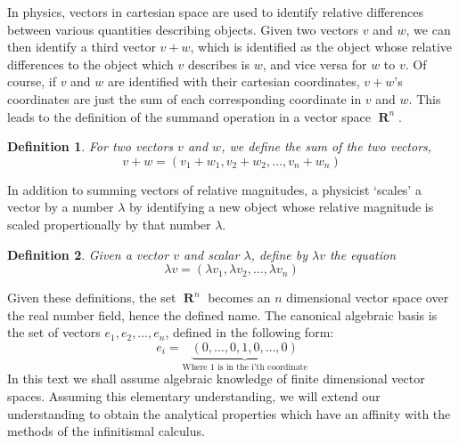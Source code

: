 \documentclass{report}
\newtheorem{definition}{Definition}
\DeclareMathOperator{\real}{\mathbf{R}}
\begin{document}
In physics, vectors in cartesian space are used to identify relative differences between various quantities describing objects. Given two vectors $v$ and $w$, we can then identify a third vector $v + w$, which is identified as the object whose relative differences to the object which $v$ describes is $w$, and vice versa for $w$ to $v$. Of course, if $v$ and $w$ are identified with their cartesian coordinates, $v + w$'s coordinates are just the sum of each corresponding coordinate in $v$ and $w$. This leads to the definition of the summand operation in a vector space $\real^n$.

\begin{definition}
  For two vectors $v$ and $w$, we define the sum of the two vectors,
  \[v + w = (v_1 + w_1, v_2 + w_2, \dots, v_n + w_n)\]
\end{definition}

\begin{center}
\end{center}

In addition to summing vectors of relative magnitudes, a physicist `scales' a vector by a number $\lambda$ by identifying a new object whose relative magnitude is scaled propertionally by that number $\lambda$.

\begin{definition}
  Given a vector $v$ and scalar $\lambda$, define by $\lambda v$ the equation
  \[ \lambda v = (\lambda v_1, \lambda v_2, \dots, \lambda v_n) \]
\end{definition}

Given these definitions, the set $\real^n$ becomes an $n$ dimensional vector space over the real number field, hence the defined name. The canonical algebraic basis is the set of vectors $e_1, e_2, \dots, e_n$, defined in the following form:
%
\[ e_i = \underbrace{(0, \dots, 0, 1, 0, \dots, 0)}_\text{Where 1 is in the i'th coordinate} \]
%
In this text we shall assume algebraic knowledge of finite dimensional vector spaces. Assuming this elementary understanding, we will extend our understanding to obtain the analytical properties which have an affinity with the methods of the infinitismal calculus.
\end{document}
